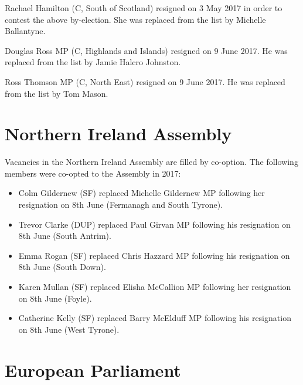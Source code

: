\documentclass[a4paper,openany]{book}
\begin{document}
Rachael Hamilton (C, South of Scotland) resigned on 3 May 2017 in order to contest the above by-election.  She was replaced from the list by Michelle Ballantyne.

Douglas Ross MP (C, Highlands and Islands) resigned on 9 June 2017.  He was replaced from the list by Jamie Halcro Johnston.

Ross Thomson MP (C, North East) resigned on 9 June 2017.  He was replaced from the list by Tom Mason.

\section{Northern Ireland Assembly}

Vacancies in the Northern Ireland Assembly are filled by co-option.
%
The following members were co-opted to the Assembly in 2017:
\begin{itemize}
\item Colm Gildernew (SF) replaced Michelle Gildernew MP following her resignation on 8th June (Fermanagh and South Tyrone).
\item Trevor Clarke (DUP) replaced Paul Girvan MP following his resignation on 8th June (South Antrim).
\item Emma Rogan (SF) replaced Chris Hazzard MP following his resignation on 8th June (South Down).
\item Karen Mullan (SF) replaced Elisha McCallion MP following her resignation on 8th June (Foyle).
\item Catherine Kelly (SF) replaced Barry McElduff MP following his resignation on 8th June (West Tyrone).
\end{itemize}

\section{European Parliament}
\end{document}
